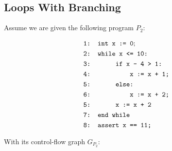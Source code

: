 \documentclass{article}
\newcommand\mycom[1]{}
\newcommand\mycom[1]{#1}
\newcommand{\jw}[1]{\mycom{\todo[color=blue!40,inline]{\small JW: #1}}}
\begin{document}
\subsection{Loops With Branching}
\jw{TODO: Text and defs}
Assume we are given the following program $P_2$: \\
\begin{figure}[H]
	\begin{align*}
		&\texttt{1: int x := 0}; \\
		&\texttt{2: while x <= 10:} \\
		&\texttt{3: \hspace*{2em} if x - 4 > 1:} \\
		&\texttt{4: \hspace*{4em} x := x + 1;} \\
		&\texttt{5: \hspace*{2em} else:} \\
		&\texttt{6: \hspace*{4em} x := x + 2;} \\
		&\texttt{5: \hspace*{2em} x := x + 2} \\
		&\texttt{7: end while} \\
		&\texttt{8: assert x == 11;}
	\end{align*}
	\label{fig:square}
\end{figure}
With its control-flow graph $G_{P_2}$: \\
\end{document}
